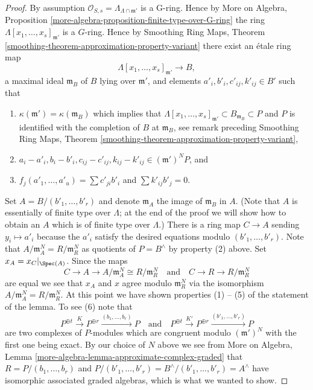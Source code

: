 \begin{proof}
\medskip\noindent
By assumption $\mathcal{O}_{S, s} = \Lambda_{\Lambda \cap \mathfrak m'}$ is
a G-ring. Hence by More on Algebra, Proposition
\ref{more-algebra-proposition-finite-type-over-G-ring}
the ring $\Lambda[x_1, \ldots, x_s]_{\mathfrak m'}$ is a $G$-ring.
Hence by Smoothing Ring Maps, Theorem
\ref{smoothing-theorem-approximation-property-variant}
there exist an \'etale ring map
$$
\Lambda[x_1, \ldots, x_s]_{\mathfrak m'} \to B,
$$
a maximal ideal $\mathfrak m_B$ of $B$ lying over $\mathfrak m'$, and
elements $a'_i, b'_i, c'_{ij}, k'_{ij} \in B'$ such that
\begin{enumerate}
\item $\kappa(\mathfrak m') = \kappa(\mathfrak m_B)$ which implies
that $\Lambda[x_1, \ldots, x_s]_{\mathfrak m'} \subset B_{\mathfrak m_B}
\subset P$ and $P$ is identified with the completion of $B$ at
$\mathfrak m_B$, see remark preceding Smoothing Ring Maps, Theorem
\ref{smoothing-theorem-approximation-property-variant},
\item $a_i - a'_i, b_i - b'_i, c_{ij} - c'_{ij}, k_{ij} - k'_{ij} \in
(\mathfrak m')^N P$, and
\item $f_j(a'_1, \ldots, a'_u) = \sum c'_{ji} b'_i$ and $\sum k'_{ij}b'_j = 0$.
\end{enumerate}
Set $A = B/(b'_1, \ldots, b'_r)$ and denote $\mathfrak m_A$ the
image of $\mathfrak m_B$ in $A$. (Note that $A$ is essentially of finite
type over $\Lambda$; at the end of the proof we will show how to obtain
an $A$ which is of finite type over $\Lambda$.) There is a ring map
$C \to A$ sending $y_i \mapsto a'_i$ because the $a'_i$ satisfy
the desired equations modulo $(b'_1, \ldots, b'_r)$.
Note that $A/\mathfrak m_A^N = R/\mathfrak m_R^N$ as quotients of
$P = B^\wedge$ by property (2) above. Set $x_A = x_C|_{\Spec(A)}$.
Since the maps
$$
C \to A \to A/\mathfrak m_A^N \cong R/\mathfrak m_R^N
\quad\text{and}\quad
C \to R \to R/\mathfrak m_R^N
$$
are equal we see that $x_A$ and $x$ agree modulo $\mathfrak m_R^N$
via the isomorphism $A/\mathfrak m_A^N = R/\mathfrak m_R^N$. At this
point we have shown properties (1) -- (5) of the statement of the lemma.
To see (6) note that
$$
P^{\oplus t} \xrightarrow{K}
P^{\oplus r} \xrightarrow{(b_1, \ldots, b_r)}
P
\quad\text{and}\quad
P^{\oplus t} \xrightarrow{K'}
P^{\oplus r} \xrightarrow{(b'_1, \ldots, b'_r)}
P
$$
are two complexes of $P$-modules which are congruent modulo
$(\mathfrak m')^N$ with the first one being exact. By our choice of $N$
above we see from
More on Algebra, Lemma \ref{more-algebra-lemma-approximate-complex-graded}
that $R = P/(b_1, \ldots, b_r)$ and
$P/(b'_1, \ldots, b'_r) = B^\wedge/(b'_1, \ldots, b'_r) = A^\wedge$
have isomorphic associated graded algebras, which is what we wanted to show.


\end{proof}
